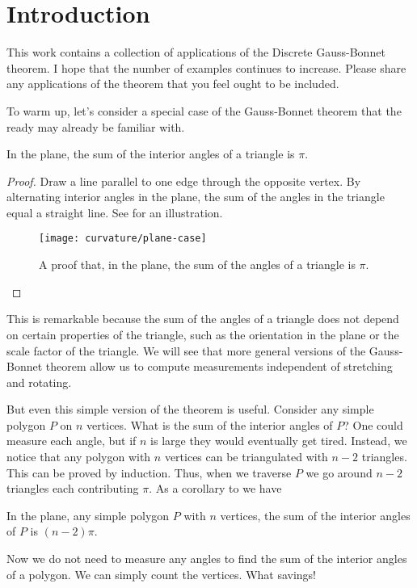 \section{Introduction}
\label{sec:intro}

This work contains a collection of applications of the 
Discrete Gauss-Bonnet theorem.
I hope that the number of examples continues to increase.
Please share any applications of the theorem that you feel
ought to  be included.


To warm up, let's consider a special case of the Gauss-Bonnet
theorem that the ready may already be familiar with.
\begin{theorem}\label{thm:triangle}
In the plane, the sum of the interior angles of a triangle is $\pi$.
\end{theorem}
\begin{proof}
Draw a line parallel to one edge through the opposite vertex.
By alternating interior angles in the plane, the sum of the angles
in the triangle equal  a straight line.
See  for an illustration. 



\begin{figure}[htb]
\centering
\texttt{[image: curvature/plane-case]}
\caption{A proof that, in the plane, the sum of the angles of a triangle is $\pi$.}
\label{fig:angles}
\end{figure}

\end{proof}

This is remarkable because the sum of the angles of a triangle does not
depend on certain properties of the  triangle, such as the orientation in the plane or
the scale factor of the triangle.
We will see that more general versions of the Gauss-Bonnet theorem allow us 
to compute measurements independent of stretching and rotating.

But even this simple version of the theorem is useful.
Consider any simple polygon $P$ on $n$ vertices. 
What is the sum of the interior angles of $P$?
One could measure each angle, but if $n$ is large they would eventually
get tired.
Instead, we notice that any polygon with $n$ vertices can be
triangulated with $n-2$ triangles. This can be proved by induction.
Thus, when we traverse $P$ we go around $n-2$ triangles each contributing
$\pi$.
As a corollary to  we have
\begin{corollary}\label{cor:angles}
In the plane, any simple polygon $P$ with $n$ vertices,
the sum of the interior angles of $P$ is $(n-2)\pi$.

\end{corollary}

Now we do not need to measure any angles to find
the sum of  the interior angles of a polygon. We can simply
count the vertices. What savings!





